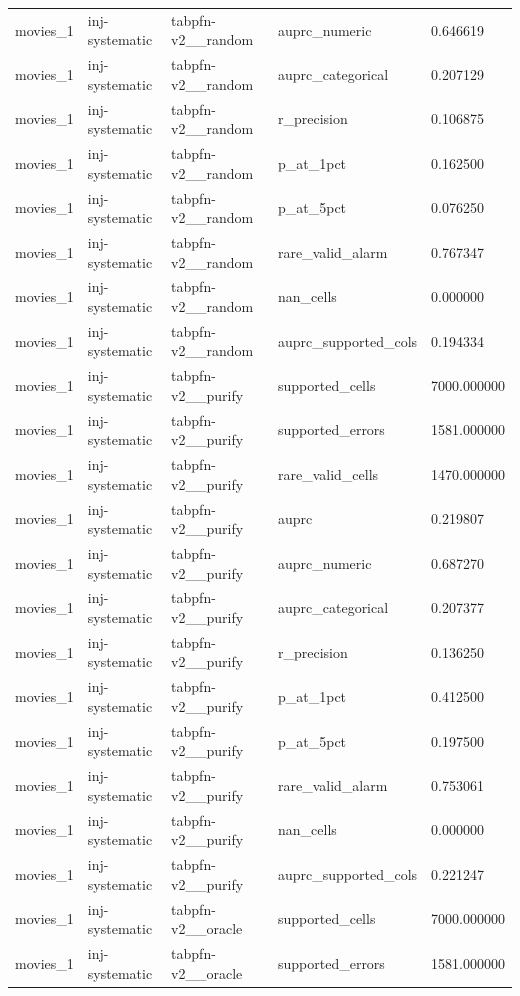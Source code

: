 \begin{tabular}{lllll}
movies\_1 & inj-systematic & tabpfn-v2\_\_random & auprc\_numeric & 0.646619 \\
movies\_1 & inj-systematic & tabpfn-v2\_\_random & auprc\_categorical & 0.207129 \\
movies\_1 & inj-systematic & tabpfn-v2\_\_random & r\_precision & 0.106875 \\
movies\_1 & inj-systematic & tabpfn-v2\_\_random & p\_at\_1pct & 0.162500 \\
movies\_1 & inj-systematic & tabpfn-v2\_\_random & p\_at\_5pct & 0.076250 \\
movies\_1 & inj-systematic & tabpfn-v2\_\_random & rare\_valid\_alarm & 0.767347 \\
movies\_1 & inj-systematic & tabpfn-v2\_\_random & nan\_cells & 0.000000 \\
movies\_1 & inj-systematic & tabpfn-v2\_\_random & auprc\_supported\_cols & 0.194334 \\
movies\_1 & inj-systematic & tabpfn-v2\_\_purify & supported\_cells & 7000.000000 \\
movies\_1 & inj-systematic & tabpfn-v2\_\_purify & supported\_errors & 1581.000000 \\
movies\_1 & inj-systematic & tabpfn-v2\_\_purify & rare\_valid\_cells & 1470.000000 \\
movies\_1 & inj-systematic & tabpfn-v2\_\_purify & auprc & 0.219807 \\
movies\_1 & inj-systematic & tabpfn-v2\_\_purify & auprc\_numeric & 0.687270 \\
movies\_1 & inj-systematic & tabpfn-v2\_\_purify & auprc\_categorical & 0.207377 \\
movies\_1 & inj-systematic & tabpfn-v2\_\_purify & r\_precision & 0.136250 \\
movies\_1 & inj-systematic & tabpfn-v2\_\_purify & p\_at\_1pct & 0.412500 \\
movies\_1 & inj-systematic & tabpfn-v2\_\_purify & p\_at\_5pct & 0.197500 \\
movies\_1 & inj-systematic & tabpfn-v2\_\_purify & rare\_valid\_alarm & 0.753061 \\
movies\_1 & inj-systematic & tabpfn-v2\_\_purify & nan\_cells & 0.000000 \\
movies\_1 & inj-systematic & tabpfn-v2\_\_purify & auprc\_supported\_cols & 0.221247 \\
movies\_1 & inj-systematic & tabpfn-v2\_\_oracle & supported\_cells & 7000.000000 \\
movies\_1 & inj-systematic & tabpfn-v2\_\_oracle & supported\_errors & 1581.000000 \\

\end{tabular}
